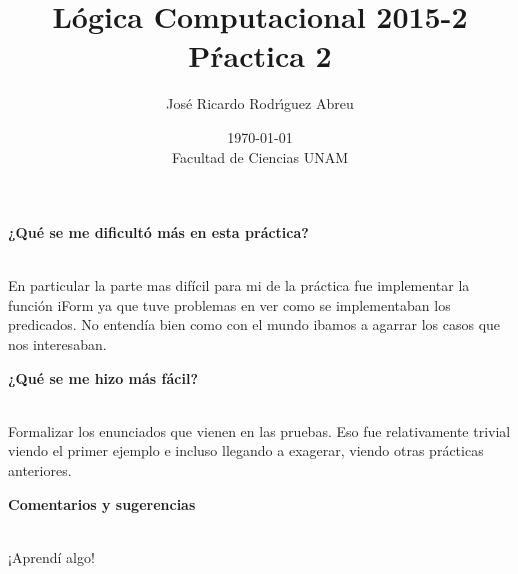 \documentclass[letterpaper,11pt]{article}
\title{Lógica Computacional 2015-2\\Pŕactica 2}
\author{Jos\'e Ricardo Rodr\'{\i}guez Abreu}
\date{\today\\ Facultad de Ciencias UNAM}
\begin{document}
 
 \maketitle

 
 \begin{center}
 {\bf ¿Qué se me dificultó más en esta práctica?}
 \end{center}
 \\
 En particular la parte mas difícil para mi de la práctica fue implementar la función iForm ya que tuve problemas en ver como se implementaban los predicados. No entendía bien como con el mundo ibamos a agarrar los casos que nos interesaban.

\begin{center} 
 {\bf ¿Qué se me hizo más fácil?}
\end{center}
 \\
 Formalizar los enunciados que vienen en las pruebas. Eso fue relativamente trivial viendo el primer ejemplo e incluso llegando a exagerar, viendo otras prácticas anteriores.
 
\begin{center}
 {\bf Comentarios y sugerencias}
  \end{center}
 \\
 ¡Aprendí algo!
 
\end{document}
